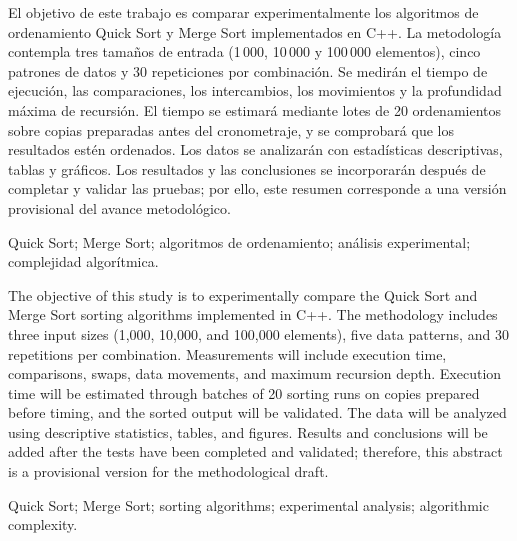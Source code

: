 \vspace{0.2cm}


{\fontsize{11}{13}\selectfont
El objetivo de este trabajo es comparar experimentalmente los algoritmos de ordenamiento Quick Sort y Merge Sort implementados en C++. La metodología contempla tres tamaños de entrada (1\,000, 10\,000 y 100\,000 elementos), cinco patrones de datos y 30 repeticiones por combinación. Se medirán el tiempo de ejecución, las comparaciones, los intercambios, los movimientos y la profundidad máxima de recursión. El tiempo se estimará mediante lotes de 20 ordenamientos sobre copias preparadas antes del cronometraje, y se comprobará que los resultados estén ordenados. Los datos se analizarán con estadísticas descriptivas, tablas y gráficos. Los resultados y las conclusiones se incorporarán después de completar y validar las pruebas; por ello, este resumen corresponde a una versión provisional del avance metodológico.
\par}

\vspace{0.15cm}
{\fontsize{11}{13}\selectfont Quick Sort; Merge Sort; algoritmos de ordenamiento; análisis experimental; complejidad algorítmica.\par}

\vspace{0.3cm}


{\fontsize{11}{13}\selectfont
The objective of this study is to experimentally compare the Quick Sort and Merge Sort sorting algorithms implemented in C++. The methodology includes three input sizes (1,000, 10,000, and 100,000 elements), five data patterns, and 30 repetitions per combination. Measurements will include execution time, comparisons, swaps, data movements, and maximum recursion depth. Execution time will be estimated through batches of 20 sorting runs on copies prepared before timing, and the sorted output will be validated. The data will be analyzed using descriptive statistics, tables, and figures. Results and conclusions will be added after the tests have been completed and validated; therefore, this abstract is a provisional version for the methodological draft.
\par}

\vspace{0.15cm}
{\fontsize{11}{13}\selectfont Quick Sort; Merge Sort; sorting algorithms; experimental analysis; algorithmic complexity.\par}

